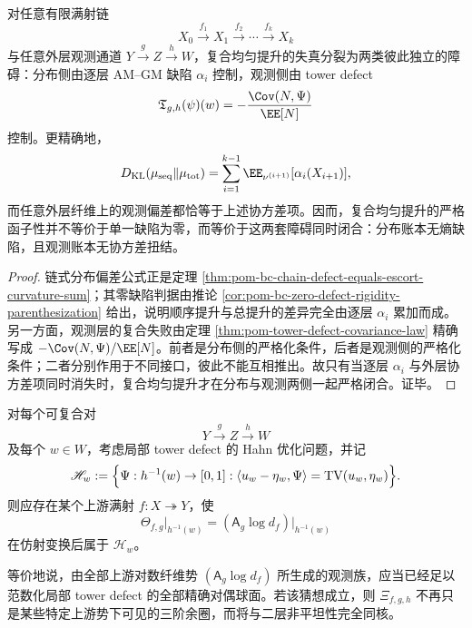 \begin{theorem}[复合均匀提升的双障碍完全分解]\label{thm:conclusion-pom-composite-uniform-lift-dual-obstruction}
对任意有限满射链
\[
X_0\xrightarrow{f_1}X_1\xrightarrow{f_2}\cdots\xrightarrow{f_k}X_k
\]
与任意外层观测通道 \(Y\xrightarrow{g}Z\xrightarrow{h}W\)，复合均匀提升的失真分裂为两类彼此独立的障碍：分布侧由逐层 AM--GM 缺陷 \(\alpha_i\) 控制，观测侧由 tower defect
\[
\mathfrak T_{g,h}(\psi)(w)=-\frac{\Cov(N,\Psi)}{\EE[N]}
\]
控制。更精确地，
\[
D_{\mathrm{KL}}(\mu_{\mathrm{seq}}\|\mu_{\mathrm{tot}})
=
\sum_{i=1}^{k-1}\EE_{\nu^{(i+1)}}[\alpha_i(X_{i+1})],
\]
而任意外层纤维上的观测偏差都恰等于上述协方差项。因而，复合均匀提升的严格函子性并不等价于单一缺陷为零，而等价于这两套障碍同时闭合：分布账本无熵缺陷，且观测账本无协方差扭结。
\end{theorem}
\begin{proof}
链式分布偏差公式正是定理 \ref{thm:pom-bc-chain-defect-equals-escort-curvature-sum}；其零缺陷判据由推论 \ref{cor:pom-bc-zero-defect-rigidity-parenthesization} 给出，说明顺序提升与总提升的差异完全由逐层 \(\alpha_i\) 累加而成。另一方面，观测层的复合失败由定理 \ref{thm:pom-tower-defect-covariance-law} 精确写成 \(-\Cov(N,\Psi)/\EE[N]\)。前者是分布侧的严格化条件，后者是观测侧的严格化条件；二者分别作用于不同接口，彼此不能互相推出。故只有当逐层 \(\alpha_i\) 与外层协方差项同时消失时，复合均匀提升才在分布与观测两侧一起严格闭合。证毕。
\end{proof}

\begin{conjecture}\label{conj:conclusion-pom-logfiber-potentials-norming}
对每个可复合对
\[
Y\xrightarrow{g}Z\xrightarrow{h}W
\]
及每个 \(w\in W\)，考虑局部 tower defect 的 Hahn 优化问题，并记
\[
\mathscr H_w
:=
\Bigl\{
\Psi:h^{-1}(w)\to[0,1]:
\langle u_w-\eta_w,\Psi\rangle=\operatorname{TV}(u_w,\eta_w)
\Bigr\}.
\]
则应存在某个上游满射 \(f:X\twoheadrightarrow Y\)，使
\[
\Theta_{f,g}\big|_{h^{-1}(w)}
=(\mathsf A_g\log d_f)\big|_{h^{-1}(w)}
\]
在仿射变换后属于 \(\mathscr H_w\)。

等价地说，由全部上游对数纤维势 \((\mathsf A_g\log d_f)\) 所生成的观测族，应当已经足以范数化局部 tower defect 的全部精确对偶球面。若该猜想成立，则 \(\Xi_{f,g,h}\) 不再只是某些特定上游势下可见的三阶余圈，而将与二层非平坦性完全同核。
\end{conjecture}

